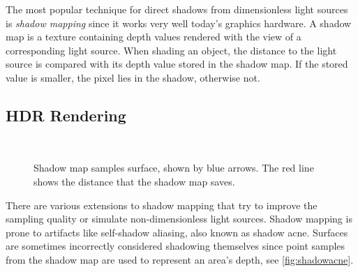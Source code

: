 \documentclass[thesis.tex]{subfiles}
\begin{document}
The most popular technique for direct shadows from dimensionless light sources is \emph{shadow mapping} \cite{bib:shadowmapping} since it works very well today's graphics hardware.
A shadow map is a texture containing depth values rendered with the view of a corresponding light source.
When shading an object, the distance to the light source is compared with its depth value stored in the shadow map.
If the stored value is smaller, the pixel lies in the shadow, otherwise not.

\subsection{HDR Rendering}

\begin{figure}[h]
\centering
{}
\\
\caption{\cite[p.351]{bib:RealtimeRenderingBook} Shadow map samples surface, shown by blue arrows. The red line shows the distance that the shadow map saves.}
\end{figure}
There are various extensions to shadow mapping that try to improve the sampling quality or simulate non-dimensionless light sources.
Shadow mapping is prone to artifacts like self-shadow aliasing, also known as shadow acne.
Surfaces are sometimes incorrectly considered shadowing themselves since point samples from the shadow map are used to represent an area's depth, see \autoref{fig:shadowacne}.
\end{document}
